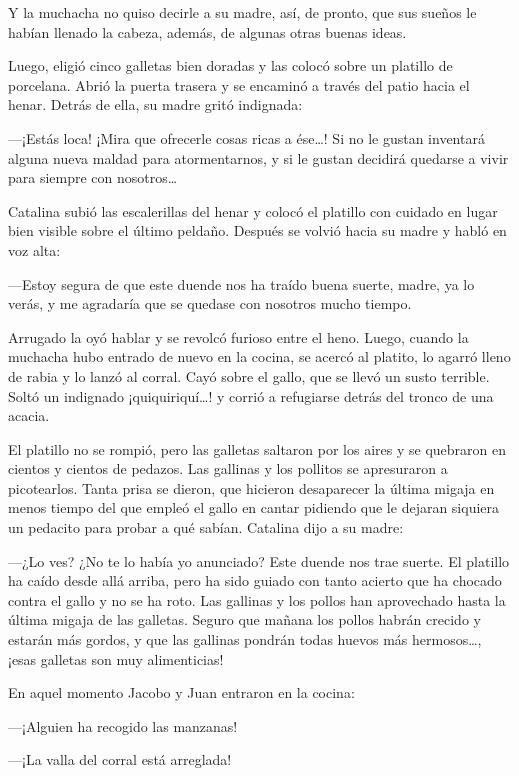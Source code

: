 \documentclass{barcodevapor3pags}
\begin{document}
Y la muchacha no quiso decirle a su madre, así, de pronto, que sus
sueños le habían llenado la cabeza, además, de algunas otras buenas
ideas.

Luego, eligió cinco galletas bien doradas y las colocó sobre un platillo
de porcelana. Abrió la puerta trasera y se encaminó a través del patio
hacia el henar. Detrás de ella, su madre gritó indignada:

---¡Estás loca! ¡Mira que ofrecerle cosas ricas a ése\ldots! Si no le
gustan inventará alguna nueva maldad para atormentarnos, y si le gustan
decidirá quedarse a vivir para siempre con nosotros\ldots{}

Catalina subió las escalerillas del henar y colocó el platillo con
cuidado en lugar bien visible sobre el último peldaño. Después se volvió
hacia su madre y habló en voz alta:

---Estoy segura de que este duende nos ha traído buena suerte, madre, ya
lo verás, y me agradaría que se quedase con nosotros mucho tiempo.

Arrugado la oyó hablar y se revolcó furioso entre el heno. Luego, cuando
la muchacha hubo entrado de nuevo en la cocina, se acercó al platito, lo
agarró lleno de rabia y lo lanzó al corral. Cayó sobre el gallo, que se
llevó un susto terrible. Soltó un indignado ¡quiquiriquí\ldots! y corrió
a refugiarse detrás del tronco de una acacia.

El platillo no se rompió, pero las galletas saltaron por los aires y se
quebraron en cientos y cientos de pedazos. Las gallinas y los pollitos
se apresuraron a picotearlos. Tanta prisa se dieron, que hicieron
desaparecer la última migaja en menos tiempo del que empleó el gallo en
cantar pidiendo que le dejaran siquiera un pedacito para probar a qué
sabían. Catalina dijo a su madre:

---¿Lo ves? ¿No te lo había yo anunciado? Este duende nos trae suerte.
El platillo ha caído desde allá arriba, pero ha sido guiado con tanto
acierto que ha chocado contra el gallo y no se ha roto. Las gallinas y
los pollos han aprovechado hasta la última migaja de las galletas.
Seguro que mañana los pollos habrán crecido y estarán más gordos, y que
las gallinas pondrán todas huevos más hermosos\ldots, ¡esas galletas son
muy alimenticias!

En aquel momento Jacobo y Juan entraron en la cocina:

---¡Alguien ha recogido las manzanas!

---¡La valla del corral está arreglada!
\end{document}
